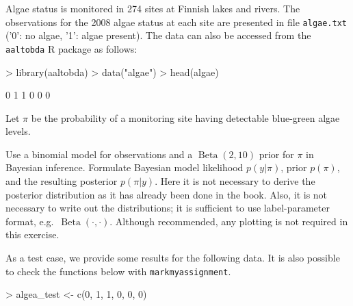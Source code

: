 \documentclass[a4paper,11pt]{article}
\DeclareMathOperator{\Beta}{Beta}
\begin{document}
Algae status is monitored in 274 sites at Finnish lakes and rivers.
The observations for the 2008 algae status at each site are presented
in file {\tt algae.txt} ('0': no algae, '1': algae present). The data
can also be accessed from the {\tt aaltobda} R package as follows:

\begin{Schunk}
\begin{Sinput}
> library(aaltobda)
> data("algae")
> head(algae)
\end{Sinput}
\begin{Soutput}
[1] 0 1 1 0 0 0
\end{Soutput}
\end{Schunk}

Let $\pi$ be the probability of a monitoring site having detectable
blue-green algae levels.

Use a binomial model for observations and a $\Beta(2,10)$ prior
for $\pi$ in Bayesian inference. Formulate Bayesian model likelihood
$p(y|\pi)$, prior $p(\pi)$, and the resulting posterior $p(\pi|y)$.
Here it is not necessary to derive the posterior distribution as it has already been done in the book.
Also, it is not necessary to write out the distributions; it is sufficient to use label-parameter format, e.g.\ $\Beta(\cdot,\cdot)$. Although recommended, any plotting is not required in this exercise.

As a test case, we provide some results for the following data. It is also possible to check the functions below with \texttt{markmyassignment}.

\begin{Schunk}
\begin{Sinput}
> algea_test <- c(0, 1, 1, 0, 0, 0)
\end{Sinput}
\end{Schunk}

\end{document}
